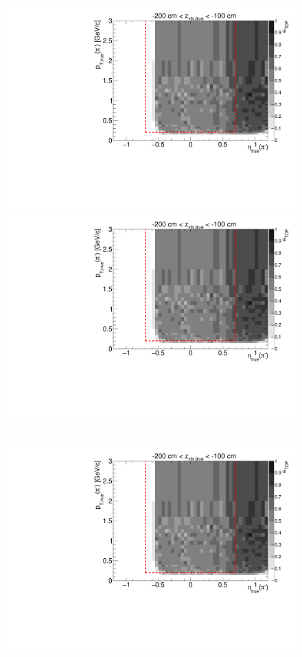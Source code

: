 \begin{figure}[hb]
{  \includegraphics[width=\linewidth,page=7]{graphics/eff/Eff2D_TOF_pion_Minus.pdf}\\
  \includegraphics[width=\linewidth,page=9]{graphics/eff/Eff2D_TOF_pion_Minus.pdf}
}~
\parbox{0.495\textwidth}{
  \centering
  \includegraphics[width=\linewidth,page=4]{graphics/eff/Eff2D_TOF_pion_Minus.pdf}\\
}
\end{figure}
